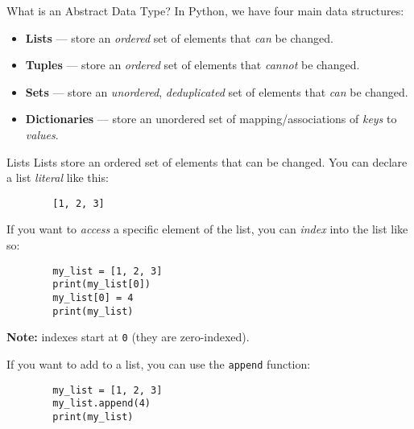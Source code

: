 \documentclass{acm}
\begin{document}
\begin{frame}{What is an Abstract Data Type?}
    In Python, we have four main data structures:
    \begin{itemize}
        \item \textbf{Lists} --- store an \textit{ordered} set of elements that
            \textit{can} be changed.
        \item \textbf{Tuples} --- store an \textit{ordered} set of elements that
            \textit{cannot} be changed.
        \item \textbf{Sets} --- store an \textit{unordered},
            \textit{deduplicated} set of elements that \textit{can} be changed.
        \item \textbf{Dictionaries} --- store an unordered set of
            mapping/associations of \textit{keys} to \textit{values}.
    \end{itemize}
\end{frame}

\begin{frame}[fragile]{Lists}
    Lists store an ordered set of elements that can be changed. You can declare
    a list \textit{literal} like this:

    \begin{verbatim}
        [1, 2, 3]
    \end{verbatim}

    \pause
    If you want to \textit{access} a specific element of the list, you can
    \textit{index} into the list like so:
    \begin{verbatim}
        my_list = [1, 2, 3]
        print(my_list[0])
        my_list[0] = 4
        print(my_list)
    \end{verbatim}
    \textbf{Note:} indexes start at \texttt{0} (they are zero-indexed).

    \pause
    If you want to add to a list, you can use the \texttt{append} function:
    \begin{verbatim}
        my_list = [1, 2, 3]
        my_list.append(4)
        print(my_list)
    \end{verbatim}
\end{frame}
\end{document}
